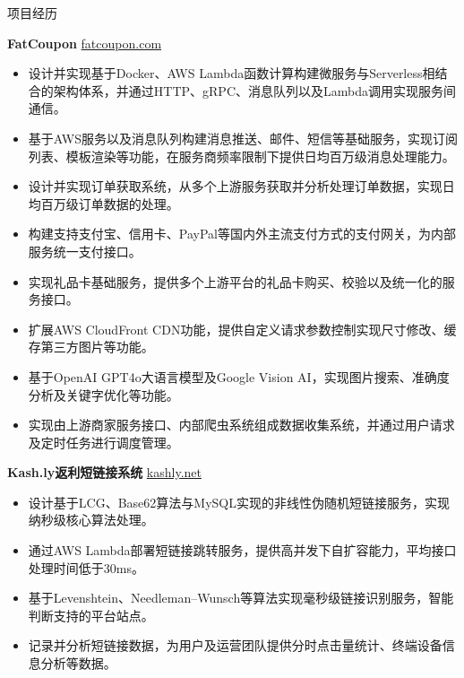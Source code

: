 \documentclass{resume} %
\begin{document}
\begin{rSection}{项目经历}
  \vspace{-1.25em}

  \item \textbf{FatCoupon} {} \hfill \href{https://fatcoupon.com}{fatcoupon.com}
  \begin{itemize}
    \itemsep -3pt {}
    \item 设计并实现基于Docker、AWS Lambda函数计算构建微服务与Serverless相结合的架构体系，并通过HTTP、gRPC、消息队列以及Lambda调用实现服务间通信。
    \item 基于AWS服务以及消息队列构建消息推送、邮件、短信等基础服务，实现订阅列表、模板渲染等功能，在服务商频率限制下提供日均百万级消息处理能力。
    \item 设计并实现订单获取系统，从多个上游服务获取并分析处理订单数据，实现日均百万级订单数据的处理。
    \item 构建支持支付宝、信用卡、PayPal等国内外主流支付方式的支付网关，为内部服务统一支付接口。
    \item 实现礼品卡基础服务，提供多个上游平台的礼品卡购买、校验以及统一化的服务接口。
    \item 扩展AWS CloudFront CDN功能，提供自定义请求参数控制实现尺寸修改、缓存第三方图片等功能。
  \end{itemize}

  \item \textbf{} {}
  \begin{itemize}
    \itemsep -3pt {}
    \item 基于OpenAI GPT4o大语言模型及Google Vision AI，实现图片搜索、准确度分析及关键字优化等功能。
    \item 实现由上游商家服务接口、内部爬虫系统组成数据收集系统，并通过用户请求及定时任务进行调度管理。
  \end{itemize}

  \item \textbf{Kash.ly返利短链接系统} {} \hfill \href{https://kashly.net}{kashly.net}
  \begin{itemize}
    \itemsep -3pt {}
    \item 设计基于LCG、Base62算法与MySQL实现的非线性伪随机短链接服务，实现纳秒级核心算法处理。
    \item 通过AWS Lambda部署短链接跳转服务，提供高并发下自扩容能力，平均接口处理时间低于30ms。
    \item 基于Levenshtein、Needleman–Wunsch等算法实现毫秒级链接识别服务，智能判断支持的平台站点。
    \item 记录并分析短链接数据，为用户及运营团队提供分时点击量统计、终端设备信息分析等数据。
  \end{itemize}


\end{rSection}
\end{document}
